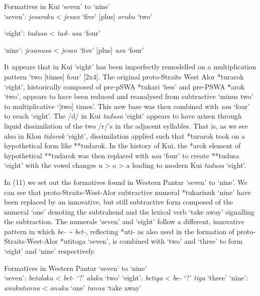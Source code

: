 {\ea%
\label{ex:10}
 Formatives in Kui `seven' to `nine'\\
\ea `seven':  \textit{j}\textit{esaroku}  {\textless}  \textit{jesan} `five'   [plus]  \textit{oruku} `two'

\ex `eight':    \textit{tadusa}    {\textless}  \textit{tad-}      \textit{usa} `four'

\ex `nine':    \textit{je}\textit{sanusa}  {\textless}    \textit{jesan} `five'  [plus]  \textit{usa} `four'
\z
\z

It appears that in Kui `eight' has been imperfectly remodelled on a multiplication pattern `two [times] four' [2x4]. The original proto-Straits West Alor *turarok `eight', historically composed of pre-pSWA *tukari `less' and pre-PSWA *arok `two', appears to have been reduced and reanalysed from subtractive `minus two' to multiplicative `[two] times'. This new base was then combined with \textit{usa} `four' to reach `eight'. The /d/ in Kui \textit{tadusa} `eight' appears to have arisen through liquid dissimilation of the two /r/'s in the adjacent syllables. That is, as we see also in Klon \textit{tidorok} `eight', dissimilation applied such that *turarok took on a hypothetical form like **tudarok. In the history of Kui, the *arok element of hypothetical **tudarok was then replaced with \textit{usa} `four' to create **tudusa `eight' with the vowel changes u {\textgreater} o {\textgreater} a leading to modern Kui \textit{tadusa} `eight'.

In (11) we set out the formatives found in Western Pantar `seven' to `nine'. We can see that proto-Straits-West-Alor subtractive numeral *tukarinuk `nine' have been replaced by an innovative, but still subtractive form composed of the numeral `one' denoting the subtrahend and the lexical verb `take away' signalling the subtraction. The numerals `seven' and `eight' follow a different, innovative pattern in which \textit{be- \~{} bet-}, reflecting *{\texthtb}uti- as also used in the formation of proto-Straits-West-Alor *{\texthtb}utitoga `seven', is combined with `two' and `three' to form `eight' and `nine' respectively.



\ea%
\label{ex:11}
Formatives in Western Pantar `seven' to `nine'\\
\ea `seven':  \textit{betalaku}    {\textless}  \textit{bet-} `?'   \textit{alaku} `two'
\ex `eight':    \textit{betiga}      {\textless}  \textit{be-} `?'     \textit{tiga} `three'
\ex  `nine':    \textit{anukutanna}\textit{{\ng}}   {\textless}  \textit{anuku} `one'   \textit{tanna}\textit{{\ng}} `take away'
\z
\z

}

